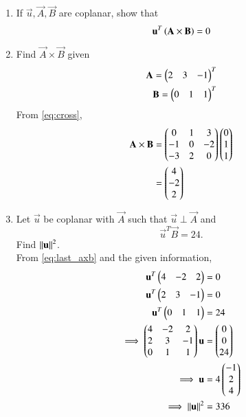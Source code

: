 \renewcommand{\theequation}{\theenumi}
\begin{enumerate}[label=\arabic*.,ref=\thesubsection.\theenumi]
\item If $\vec{u}, \vec{A}, \vec{B}$ are coplanar, show that
\begin{equation}
\mathbf{u}^T\left(\mathbf{A}\times \mathbf{B}\right) = 0
\label{eq:coplanar}
\end{equation}
%
\item Find $\vec{A}\times \vec{B}$ given
\begin{align}
\mathbf{A}=\begin{pmatrix}2 & 3 & -1\end{pmatrix}^T
\\
\mathbf{B}=\begin{pmatrix}0 & 1 & 1\end{pmatrix}^T
\end{align}
\solution From \eqref{eq:cross},
\begin{align}
\mathbf{A}\times \mathbf{B} &= \begin{pmatrix}0 & 1& 3 \\ -1 & 0 & -2 \\ -3 & 2 & 0\end{pmatrix}\begin{pmatrix}0 \\ 1 \\ 1\end{pmatrix}
\\
&= \begin{pmatrix}4 \\ -2 \\ 2\end{pmatrix}
\label{eq:last_axb}
\end{align}

\item Let $\vec{u}$ be coplanar with $\vec{A}$
%
such that $\vec{u}\perp\vec{A}$ and
\begin{equation}
\vec{u}^T\vec{B} = 24.
\label{eq:uB}
\end{equation}
Find $\left\lVert\mathbf{u}\right\rVert^2$.
\\
\solution From \eqref{eq:last_axb} and the given information,
\begin{align}
\mathbf{u}^T\begin{pmatrix}4 & -2 & 2\end{pmatrix} &=0
\\
\mathbf{u}^T\begin{pmatrix}2 & 3 & -1\end{pmatrix} &=0
\\
\mathbf{u}^T\begin{pmatrix}0 & 1 & 1\end{pmatrix} &=24
\\
\implies \begin{pmatrix}4 & -2 & 2
\\
2 & 3 & -1
\\
0 & 1 & 1
\end{pmatrix}\mathbf{u}
&= \begin{pmatrix}0 \\ 0 \\ 24\end{pmatrix}
\\
\implies 
\mathbf{u} &= 4 \begin{pmatrix}-1 \\ 2 \\ 4\end{pmatrix}
\\
\implies \left\lVert\mathbf{u}\right\rVert^2 &= 336
\end{align}
\end{enumerate}
